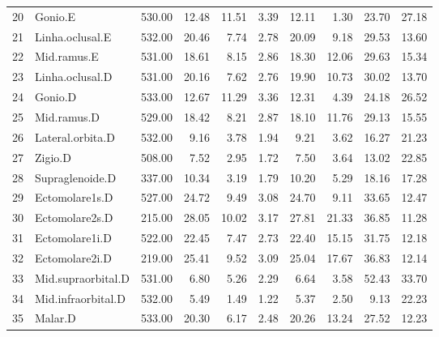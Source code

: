 \begin{table}[ht]
\begin{tabular}{rlrrrrrrrr}
  20 & Gonio.E & 530.00 & 12.48 & 11.51 & 3.39 & 12.11 & 1.30 & 23.70 & 27.18 \\ 
  21 & Linha.oclusal.E & 532.00 & 20.46 & 7.74 & 2.78 & 20.09 & 9.18 & 29.53 & 13.60 \\ 
  22 & Mid.ramus.E & 531.00 & 18.61 & 8.15 & 2.86 & 18.30 & 12.06 & 29.63 & 15.34 \\ 
  23 & Linha.oclusal.D & 531.00 & 20.16 & 7.62 & 2.76 & 19.90 & 10.73 & 30.02 & 13.70 \\ 
  24 & Gonio.D & 533.00 & 12.67 & 11.29 & 3.36 & 12.31 & 4.39 & 24.18 & 26.52 \\ 
  25 & Mid.ramus.D & 529.00 & 18.42 & 8.21 & 2.87 & 18.10 & 11.76 & 29.13 & 15.55 \\ 
  26 & Lateral.orbita.D & 532.00 & 9.16 & 3.78 & 1.94 & 9.21 & 3.62 & 16.27 & 21.23 \\ 
  27 & Zigio.D & 508.00 & 7.52 & 2.95 & 1.72 & 7.50 & 3.64 & 13.02 & 22.85 \\ 
  28 & Supraglenoide.D & 337.00 & 10.34 & 3.19 & 1.79 & 10.20 & 5.29 & 18.16 & 17.28 \\ 
  29 & Ectomolare1s.D & 527.00 & 24.72 & 9.49 & 3.08 & 24.70 & 9.11 & 33.65 & 12.47 \\ 
  30 & Ectomolare2s.D & 215.00 & 28.05 & 10.02 & 3.17 & 27.81 & 21.33 & 36.85 & 11.28 \\ 
  31 & Ectomolare1i.D & 522.00 & 22.45 & 7.47 & 2.73 & 22.40 & 15.15 & 31.75 & 12.18 \\ 
  32 & Ectomolare2i.D & 219.00 & 25.41 & 9.52 & 3.09 & 25.04 & 17.67 & 36.83 & 12.14 \\ 
  33 & Mid.supraorbital.D & 531.00 & 6.80 & 5.26 & 2.29 & 6.64 & 3.58 & 52.43 & 33.70 \\ 
  34 & Mid.infraorbital.D & 532.00 & 5.49 & 1.49 & 1.22 & 5.37 & 2.50 & 9.13 & 22.23 \\ 
  35 & Malar.D & 533.00 & 20.30 & 6.17 & 2.48 & 20.26 & 13.24 & 27.52 & 12.23 \\ 
   \hline
\end{tabular}
\end{table}
